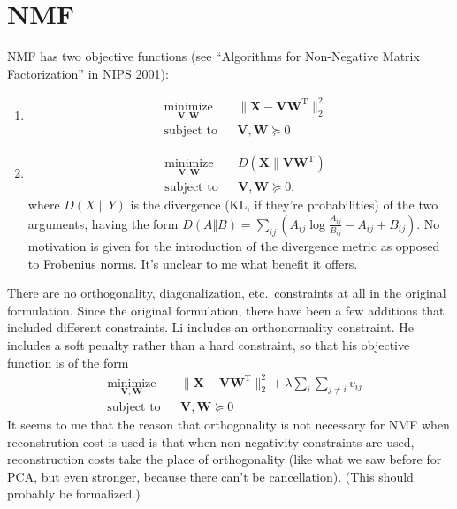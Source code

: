 \documentclass{article}
\newcommand{\transpose}{^\mathrm{T}}
\begin{document}
\section*{NMF}
NMF has two objective functions (see ``Algorithms for Non-Negative Matrix Factorization'' in NIPS 2001):
\begin{enumerate}
\item \begin{equation}
\begin{aligned}
&\underset{\mathbf{V}, \mathbf{W}}{\text{minimize}} &&\| \mathbf{X} - \mathbf{VW}\transpose\|_2^2 \\ 
& \text{subject to} & &\mathbf{V,W} \succeq 0 
\end{aligned}
\end{equation}
\item
\begin{equation}
\begin{aligned}
&\underset{\mathbf{V}, \mathbf{W}}{\text{minimize}} && D\left(\mathbf{X} \|  \mathbf{VW}\transpose\right) \\ 
& \text{subject to} & &\mathbf{V,W} \succeq 0, 
\end{aligned}
\end{equation}
where $D\left(X\|Y\right)$ is the divergence (KL, if they're probabilities) of the two arguments, having the form $D\left(A\Vert B\right)=\sum_{ij}\left(A_{ij}\log\frac{A_{ij}}{B_{ij}} - A_{ij} + B_{ij}\right)$.  No motivation is given for the introduction of the divergence metric as opposed to Frobenius norms.  It's unclear to me what benefit it offers. 
\end{enumerate}
There are no orthogonality, diagonalization, etc.\ constraints at all in the original formulation.  Since the original formulation, there have been a few additions that included different constraints. Li \cite{li_learning_2001} includes an orthonormality constraint.  He includes a soft penalty rather than a hard constraint, so that his objective function is of the form 
\begin{equation}
\begin{aligned}
&\underset{\mathbf{V}, \mathbf{W}}{\text{minimize}} &&\| \mathbf{X} - \mathbf{VW}\transpose\|_2^2 + \lambda \sum_i \sum_{j \neq i} v_{ij}\\  
& \text{subject to} & &\mathbf{V,W} \succeq 0 
\end{aligned}
\end{equation}
It seems to me that the reason that orthogonality is not necessary for NMF when reconstrution cost is used is that when non-negativity constraints are used, reconstruction costs take the place of orthogonality (like what we saw before for PCA, but even stronger, because there can't be cancellation). (This should probably be formalized.)  
\end{document}
